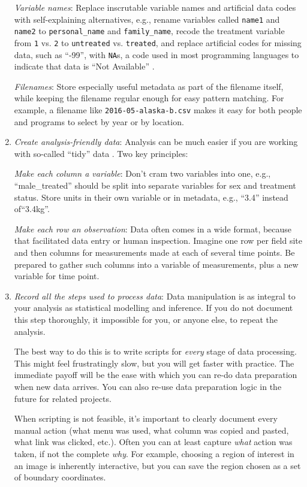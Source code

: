 \documentclass[10pt]{article}
\newcommand{\recommend}[1]{\textit{#1}}
\begin{document}
\begin{enumerate}
  \emph{Variable names}: Replace inscrutable variable names
  and artificial data codes with self-explaining alternatives, e.g.,
  rename variables called \texttt{name1} and \texttt{name2} to
  \texttt{personal\_name} and \texttt{family\_name}, recode the
  treatment variable from \texttt{1} vs.  \texttt{2} to
  \texttt{untreated} vs. \texttt{treated}, and replace artificial
  codes for missing data, such as ``-99'', with \texttt{NA}s,
  a code used in most programming languages to indicate that data is ``Not Available''
  \cite{white2013}.

  \emph{Filenames}: Store especially useful metadata as part of the filename itself, while
  keeping the filename regular enough for easy pattern matching. For example, a filename
  like \texttt{2016-05-alaska-b.csv} makes it easy for both people and programs to select
  by year or by location.

\item
  \recommend{Create analysis-friendly data}: Analysis can be much easier if you are
  working with so-called ``tidy'' data \cite{wickham2014}. Two key principles:

  \emph{Make each column a variable}: Don't cram two variables into one, e.g.,
  ``male\_treated'' should be split into separate variables for sex and treatment status.
  Store units in their own variable or in metadata, e.g., ``3.4'' instead of``3.4kg''.

  \emph{Make each row an observation}: Data often comes in a wide format, because that
  facilitated data entry or human inspection. Imagine one row per field site and then
  columns for measurements made at each of several time points. Be prepared to gather such
  columns into a variable of measurements, plus a new variable for time point.

\item
  \recommend{Record all the steps used to process data}: Data manipulation is as integral
  to your analysis as statistical modelling and inference. If you do not document this
  step thoroughly, it impossible for you, or anyone else, to repeat the analysis.
  
  The best way to do this is to write scripts for \emph{every} stage of data processing.
  This might feel frustratingly slow, but you will get faster with practice. The
  immediate payoff will be the ease with which you can re-do data preparation when new
  data arrives. You can also re-use data preparation logic in the future for related
  projects.

  When scripting is not feasible, it's important to clearly document every manual action
  (what menu was used, what column was copied and pasted, what link was clicked, etc.).
  Often you can at least capture \emph{what} action was taken, if not the complete
  \emph{why}. For example, choosing a region of interest in an image is inherently
  interactive, but you can save the region chosen as a set of boundary coordinates.


\end{enumerate}
\end{document}
